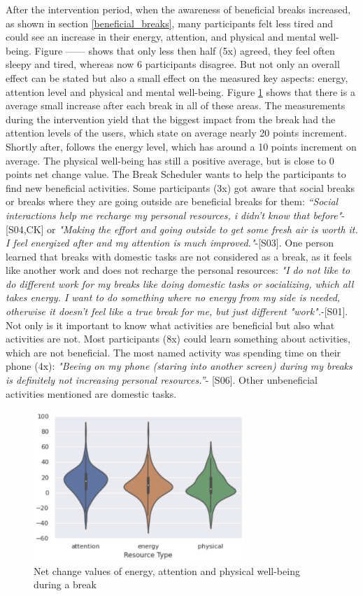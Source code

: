 \documentclass{hasel_thesis}
\begin{document}
After the intervention period, when the awareness of beneficial breaks increased, as shown in section \ref{beneficial_breaks}, many participants felt less tired and could see an increase in their energy, attention, and physical and mental well-being. Figure ------ shows that only less then half (5x) agreed, they feel often sleepy and tired, whereas now 6 participants disagree. But not only an overall effect can be stated but also a small effect on the measured key aspects: energy, attention level and physical and mental well-being. Figure \ref{fig:change_break} shows that there is a average small increase after each break in all of these areas. The measurements during the intervention yield that the biggest impact from the break had the attention levels of the users, which state on average nearly 20 points increment. Shortly after, follows the energy level, which has around a 10 points increment on average. The physical well-being has still a positive average, but is close to 0 points net change value. The Break Scheduler wants to help the participants to find new beneficial activities. Some participants (3x) got aware that social breaks or breaks where they are going outside are beneficial breaks for them: \textit{“Social interactions help me recharge my personal resources, i didn't know that before"}-[S04,CK] or \textit{"Making the effort and going outside to get some fresh air is worth it. I feel energized after and my attention is much improved."}-[S03]. One person learned that breaks with domestic tasks are not considered as a break, as it feels like another work and does not recharge the personal resources: \textit{"I do not like to do different work for my breaks like doing domestic tasks or socializing, which all takes energy. I want to do something where no energy from my side is needed, otherwise it doesn't feel like a true break for me, but just different "work".}-[S01]. Not only is it important to know what activities are beneficial but also what activities are not. Most participants (8x) could learn something about activities, which are not beneficial. The most named activity was spending time on their phone (4x): \textit{"Beeing on my phone (staring into another screen) during my breaks is definitely not increasing personal resources.”}- [S06]. Other unbeneficial activities mentioned are domestic tasks. 

\begin{figure}[htp]
    \centering
    \includegraphics[width=8cm]{hasel_thesis/images/change_break.png}
    \caption{Net change values of energy, attention and physical well-being during a break}
    \label{fig:change_break}
\end{figure}
\end{document}

